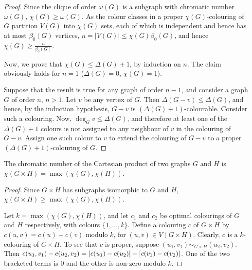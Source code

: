 \begin{proof}
Since the clique of order $\omega(G)$ is a subgraph with chromatic number $\omega(G)$, $\chi(G) \ge \omega(G)$. As the colour classes in a proper $\chi(G)$-colouring of $G$ partition $V(G)$ into $\chi(G)$ sets, each of which is independent and hence has at most $\beta_0(G)$ vertices, $n = |V(G)| \le \chi(G) \beta_0(G)$, and hence $\chi(G) \ge \frac n {\beta_0(G)}$.

Now, we prove that $\chi(G) \le \Delta(G) + 1$, by induction on $n$. The claim obviously holds for $n = 1$ ($\Delta(G) = 0$, $\chi(G) = 1$).

Suppose that the result is true for any graph of order $n - 1$, and consider a graph $G$ of order $n$, $n > 1$. Let $v$ be any vertex of $G$. Then $\Delta(G - v) \le \Delta(G)$, and hence, by the induction hypothesis, $G - v$ is $(\Delta(G) + 1)$-colourable. Consider such a colouring. Now, $\deg_G v \le \Delta(G)$, and therefore at least one of the $\Delta(G) + 1$ colours is not assigned to any neighbour of $v$ in the colouring of $G - v$. Assign one such colour to $v$ to extend the colouring of $G - v$ to a proper $(\Delta(G) + 1)$-colouring of $G$.
\end{proof}

\begin{Theorem}
The chromatic number of the Cartesian product of two graphs $G$ and $H$ is $\chi(G \times H) = \max(\chi(G), \chi(H))$.
\end{Theorem}

\begin{proof}
Since $G \times H$ has subgraphs isomorphic to $G$ and $H$, $\chi(G \times H) \ge \max(\chi(G), \chi(H))$.

Let $k = \max(\chi(G), \chi(H))$, and let $c_1$ and $c_2$ be optimal colourings of $G$ and $H$ respectively, with colours $\{1, \ldots, k\}$. Define a colouring $c$ of $G \times H$ by $c(u, v) = c(u) + c(v)$ modulo $k$, for $(u, v) \in V(G \times H)$. Clearly, $c$ is a $k$-colouring of $G \times H$. To see that $c$ is proper, suppose $(u_1, v_1) \sim_{G \times H} (u_2, v_2)$. Then $c(u_1, v_1) - c(u_2, v_2) = \bqty{c(u_1) - c(u_2)} + \bqty{c(v_1) - c(v_2)}$. One of the two bracketed terms is $0$ and the other is non-zero modulo $k$.
\end{proof}

